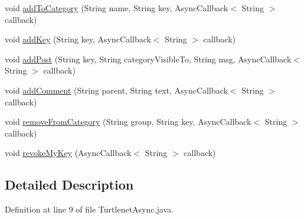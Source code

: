 \begin{DoxyCompactItemize}
\item 
void \hyperlink{interfaceballmerpeak_1_1turtlenet_1_1client_1_1TurtlenetAsync_a8540db4f0ac20ac80e8bca4346761257}{add\-To\-Category} (String name, String key, Async\-Callback$<$ String $>$ callback)
\item 
void \hyperlink{interfaceballmerpeak_1_1turtlenet_1_1client_1_1TurtlenetAsync_a165c61e5dc2d3aac741bf47c07186b01}{add\-Key} (String key, Async\-Callback$<$ String $>$ callback)
\item 
void \hyperlink{interfaceballmerpeak_1_1turtlenet_1_1client_1_1TurtlenetAsync_a6bc9fd822a1776de7cb42561e567cc18}{add\-Post} (String key, String category\-Visible\-To, String msg, Async\-Callback$<$ String $>$ callback)
\item 
void \hyperlink{interfaceballmerpeak_1_1turtlenet_1_1client_1_1TurtlenetAsync_a83a5d15e18989bb17ac0bc36d4112dc9}{add\-Comment} (String parent, String text, Async\-Callback$<$ String $>$ callback)
\item 
void \hyperlink{interfaceballmerpeak_1_1turtlenet_1_1client_1_1TurtlenetAsync_a9b2834a568cdf734a62200928a259eb2}{remove\-From\-Category} (String group, String key, Async\-Callback$<$ String $>$ callback)
\item 
void \hyperlink{interfaceballmerpeak_1_1turtlenet_1_1client_1_1TurtlenetAsync_a03d97f6d5e9f45f538af9c45eb460b94}{revoke\-My\-Key} (Async\-Callback$<$ String $>$ callback)
\end{DoxyCompactItemize}


\subsection{Detailed Description}


Definition at line 9 of file Turtlenet\-Async.\-java.



